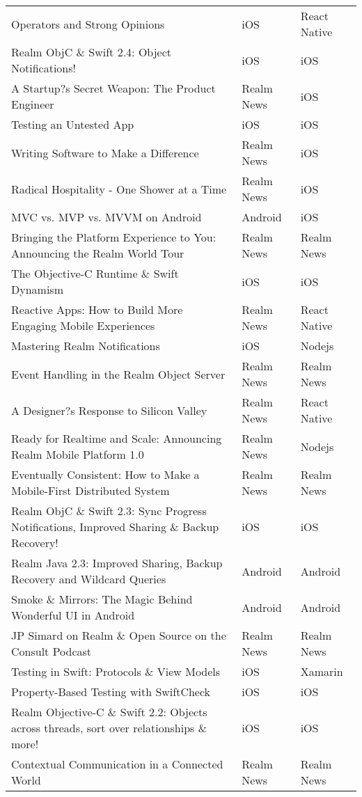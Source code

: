 \documentclass[letterpaper,11pt]{article}
\begin{document}
\begin{table}[h]
\begin{adjustbox}{max width=\linewidth}
\begin{tabular}{ | l | l | l |}
Operators and Strong Opinions & iOS & React Native \\
Realm ObjC \& Swift 2.4: Object Notifications! & iOS & iOS \\
A Startup?s Secret Weapon: The Product Engineer & Realm News & iOS \\
Testing an Untested App & iOS & iOS \\
Writing Software to Make a Difference & Realm News & iOS \\
Radical Hospitality - One Shower at a Time & Realm News & iOS \\
MVC vs. MVP vs. MVVM on Android & Android & iOS \\
Bringing the Platform Experience to You: Announcing the Realm World Tour & Realm News & Realm News \\
The Objective-C Runtime \& Swift Dynamism & iOS & iOS \\
Reactive Apps: How to Build More Engaging Mobile Experiences & Realm News & React Native \\
Mastering Realm Notifications & iOS & Nodejs \\
Event Handling in the Realm Object Server & Realm News & Realm News \\
A Designer?s Response to Silicon Valley & Realm News & React Native \\
Ready for Realtime and Scale: Announcing Realm Mobile Platform 1.0 & Realm News & Nodejs \\
Eventually Consistent: How to Make a Mobile-First Distributed System & Realm News & Realm News \\
Realm ObjC \& Swift 2.3: Sync Progress Notifications, Improved Sharing \& Backup Recovery! & iOS & iOS \\
Realm Java 2.3: Improved Sharing, Backup Recovery and Wildcard Queries & Android & Android \\
Smoke \& Mirrors: The Magic Behind Wonderful UI in Android & Android & Android \\
JP Simard on Realm \& Open Source on the Consult Podcast & Realm News & Realm News \\
Testing in Swift: Protocols \& View Models & iOS & Xamarin \\
Property-Based Testing with SwiftCheck & iOS & iOS \\
Realm Objective-C \& Swift 2.2: Objects across threads, sort over relationships \& more! & iOS & iOS \\
Contextual Communication in a Connected World & Realm News & Realm News \\

\end{tabular}
\end{adjustbox}
\end{table}
\end{document}
